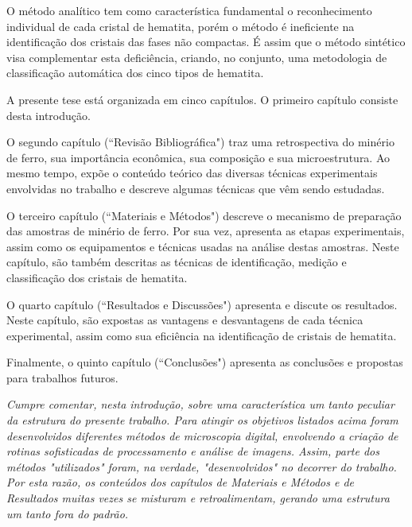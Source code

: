 O método analítico tem como característica fundamental o
reconhecimento individual de cada cristal de hematita, porém o método
é ineficiente na identificação dos cristais das fases não compactas. É
assim que o método sintético visa complementar esta deficiência,
criando, no conjunto, uma metodologia de classificação automática dos
cinco tipos de hematita.

A presente tese está organizada em cinco capítulos. O primeiro
capítulo consiste desta introdução.

O segundo capítulo (``Revisão Bibliográfica") traz uma retrospectiva
do minério de ferro, sua importância econômica, sua composição e sua
microestrutura. Ao mesmo tempo, expõe o conteúdo teórico das diversas
técnicas experimentais envolvidas no trabalho e descreve algumas
técnicas que vêm sendo estudadas.

O terceiro capítulo (``Materiais e Métodos") descreve o mecanismo de
preparação das amostras de minério de ferro. Por sua vez, apresenta as
etapas experimentais, assim como os equipamentos e técnicas usadas na
análise destas amostras. Neste capítulo, são também descritas as
técnicas de identificação, medição e classificação dos cristais de
hematita.

O quarto capítulo (``Resultados e Discussões") apresenta e discute os
resultados. Neste capítulo, são expostas as vantagens e desvantagens
de cada técnica experimental, assim como sua eficiência na
identificação de cristais de hematita.

Finalmente, o quinto capítulo (``Conclusões") apresenta as conclusões
e propostas para trabalhos futuros.

\textit{Cumpre comentar, nesta introdução, sobre uma característica um
  tanto peculiar da estrutura do presente trabalho. Para atingir os
  objetivos listados acima foram desenvolvidos diferentes métodos de
  microscopia digital, envolvendo a criação de rotinas sofisticadas de
  processamento e análise de imagens. Assim, parte dos métodos
  "utilizados" foram, na verdade, "desenvolvidos" no decorrer do
  trabalho. Por esta razão, os conteúdos dos capítulos de Materiais e
  Métodos e de Resultados muitas vezes se misturam e retroalimentam,
  gerando uma estrutura um tanto fora do padrão.}
